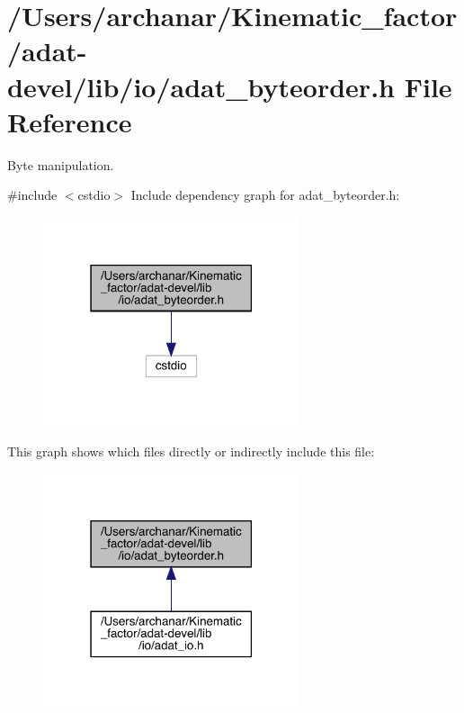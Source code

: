 \hypertarget{adat-devel_2lib_2io_2adat__byteorder_8h}{}\section{/\+Users/archanar/\+Kinematic\+\_\+factor/adat-\/devel/lib/io/adat\+\_\+byteorder.h File Reference}
\label{adat-devel_2lib_2io_2adat__byteorder_8h}


Byte manipulation.  


{\ttfamily \#include $<$cstdio$>$}\newline
Include dependency graph for adat\+\_\+byteorder.\+h\+:
\nopagebreak
\begin{figure}[H]
\begin{center}
\leavevmode
\includegraphics[width=214pt]{dd/d78/adat-devel_2lib_2io_2adat__byteorder_8h__incl}
\end{center}
\end{figure}
This graph shows which files directly or indirectly include this file\+:
\nopagebreak
\begin{figure}[H]
\begin{center}
\leavevmode
\includegraphics[width=214pt]{d4/dae/adat-devel_2lib_2io_2adat__byteorder_8h__dep__incl}
\end{center}
\end{figure}
